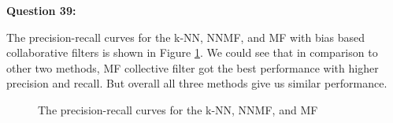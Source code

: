 \documentclass{article}
\begin{document}
\bigbreak \textbf{Question 39:}

The precision-recall curves for the k-NN, NNMF, and MF with bias based collaborative filters is shown in Figure \ref{Q39}. We could see that in comparison to other two methods, MF collective filter got the best performance with higher precision and recall. But overall all three methods give us similar performance.

\begin{figure}
\centering
{}
\caption{The precision-recall curves for the k-NN, NNMF, and MF} 
\label{Q39}
\end{figure}
\end{document}
